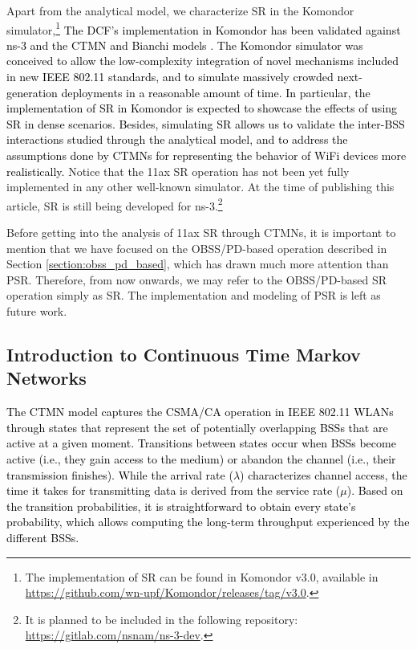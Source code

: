 \documentclass[preprint,12pt]{elsarticle}
\begin{document}
Apart from the analytical model, we characterize SR in the Komondor simulator,\footnote{The implementation of SR can be found in Komondor v3.0, available in \url{https://github.com/wn-upf/Komondor/releases/tag/v3.0}.} \textcolor{black}{The DCF's implementation in Komondor has been validated against ns-3 and the CTMN and Bianchi models \cite{barrachina2019komondor}. The Komondor simulator was conceived to allow the low-complexity integration of novel mechanisms included in new IEEE 802.11 standards, and to simulate massively crowded next-generation deployments in a reasonable amount of time. In particular, the implementation of SR in Komondor is expected to showcase the effects of using SR in dense scenarios. Besides, simulating SR allows us to validate the inter-BSS interactions studied through the analytical model, and to address the assumptions done by CTMNs for representing the behavior of WiFi devices more realistically.} Notice that the 11ax SR operation has not been yet fully implemented in any other well-known simulator. At the time of publishing this article, SR is still being developed for ns-3.\footnote{It is planned to be included in the following repository: \url{https://gitlab.com/nsnam/ns-3-dev}.}

Before getting into the analysis of 11ax SR through CTMNs, it is important to mention that we have focused on the OBSS/PD-based operation described in Section \ref{section:obss_pd_based}, which has drawn much more attention than PSR. Therefore, from now onwards, we may refer to the OBSS/PD-based SR operation simply as SR. The implementation and modeling of PSR is left as future work.

\subsection{Introduction to Continuous Time Markov Networks}
\textcolor{black}{The CTMN model captures the CSMA/CA operation in IEEE 802.11 WLANs through states that represent the set of potentially overlapping BSSs that are active at a given moment. Transitions between states occur when BSSs become active (i.e., they gain access to the medium) or abandon the channel (i.e., their transmission finishes). While the arrival rate ($\lambda$) characterizes channel access, the time it takes for transmitting data is derived from the service rate ($\mu$). Based on the transition probabilities, it is straightforward to obtain every state's probability, which allows computing the long-term throughput experienced by the different BSSs.}
\end{document}
